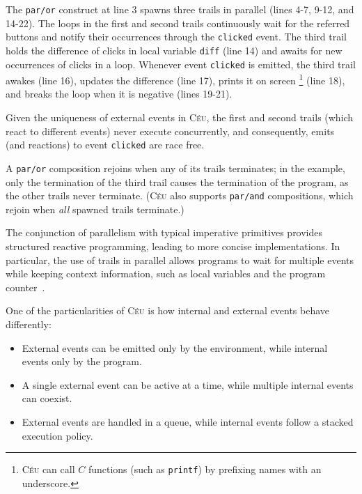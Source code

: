 \documentclass[preprint]{sigplanconf}
\newcommand{\CEU}{\textsc{C\'{e}u}\xspace}
\newcommand{\code}[1] {{\small{\texttt{#1}}}}
\newcommand{\1}{\;}
\newcommand{\2}{\;\;}
\newcommand{\3}{\;\;\;}
\newcommand{\5}{\;\;\;\;\;}
\begin{document}
The \code{par/or} construct at line 3 spawns three trails in parallel (lines 
4-7, 9-12, and 14-22).
The loops in the first and second trails continuously wait for the referred 
buttons and notify their occurrences through the \code{clicked} event.
The third trail holds the difference of clicks in local variable \code{diff} 
(line 14) and awaits for new occurrences of clicks in a loop.
Whenever event \code{clicked} is emitted, the third trail awakes (line 16), 
updates the difference (line 17), prints it on screen%
\footnote{
\CEU can call $C$ functions (such as \code{printf}) by prefixing names with an 
underscore.
} (line 18), and breaks the loop when it is negative (lines 19-21).

Given the uniqueness of external events in \CEU, the first and second trails 
(which react to different events) never execute concurrently, and consequently, 
emits (and reactions) to event \code{clicked} are race free.

A \code{par/or} composition rejoins when any of its trails terminates;
in the example, only the termination of the third trail causes the termination 
of the program, as the other trails never terminate.
(\CEU also supports \code{par/and} compositions, which rejoin when \emph{all} 
spawned trails terminate.)

The conjunction of parallelism with typical imperative primitives provides 
structured reactive programming, leading to more concise implementations.
In particular, the use of trails in parallel allows programs to wait for 
multiple events while keeping context information, such as local variables and 
the program counter~\cite{sync_async.cooperative}.

One of the particularities of \CEU is how internal and external events behave 
differently:

\begin{itemize}
\item External events can be emitted only by the environment, while internal 
events only by the program.
\item A single external event can be active at a time, while multiple internal 
events can coexist.
\item External events are handled in a queue, while internal events follow a 
stacked execution policy.
\end{itemize}

\end{document}

